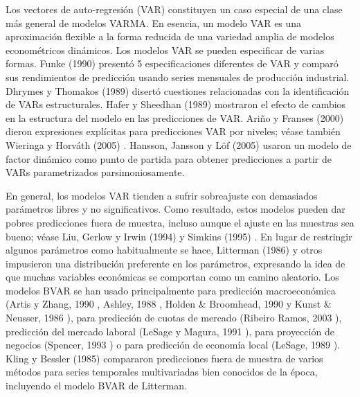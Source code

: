 \documentclass{llncs}
\begin{document}
Los vectores de auto-regresión (VAR) constituyen un caso especial de una clase más general de modelos VARMA. En esencia, un modelo VAR es una aproximación flexible a la forma reducida de una variedad amplia de modelos econométricos dinámicos. Los modelos VAR se pueden especificar de varias formas. Funke (1990) \cite{Funke1990363} presentó 5 especificaciones diferentes de VAR y comparó sus rendimientos de predicción usando series mensuales de producción industrial. Dhrymes y Thomakos (1989) \cite{Dhrymes198881} disertó cuestiones relacionadas con la identificación de VARs estructurales. Hafer y Sheedhan (1989) \cite{Hafer1989399} mostraron el efecto de cambios en la estructura del modelo en las predicciones de VAR. Ariño y Franses (2000) \cite{Arino2000111} dieron expresiones explícitas para predicciones VAR por niveles; véase también Wieringa y Horváth (2005) \cite{Wieringa2005279}. Hansson, Jansson y Löf (2005) \cite{Hansson2005377} usaron un modelo de factor dinámico como punto de partida para obtener predicciones a partir de VARs parametrizados parsimoniosamente.

En general, los modelos VAR tienden a sufrir sobreajuste con demasiados parámetros libres y no significativos. Como resultado, estos modelos pueden dar pobres predicciones fuera de muestra, incluso aunque el ajuste en las muestras sea bueno; véase Liu, Gerlow y Irwin (1994) \cite{Liu1994419} y Simkins (1995) \cite{Simkins1995569}. En lugar de restringir algunos parámetros como habitualmente se hace, Litterman (1986) \cite{Litterman198625} y otros impusieron una distribución preferente en los parámetros, expresando la idea de que muchas variables económicas se comportan como un camino aleatorio. Los modelos BVAR se han usado principalmente para predicción macroeconómica (Artis y Zhang, 1990 \cite{Artis1990349}, Ashley, 1988 \cite{Ashley1988363}, Holden \& Broomhead, 1990 \cite{Holden199011} y Kunst \& Neusser, 1986 \cite{Kunst1986447}), para predicción de cuotas de mercado (Ribeiro Ramos, 2003 \cite{RibeiroRamos200395}), predicción del mercado laboral (LeSage y Magura, 1991 \cite{LeSage1991231}), para proyección de negocios (Spencer, 1993 \cite{Spencer1993407}) o para predicción de economía local (LeSage, 1989  \cite{Lesage198937}). Kling y Bessler (1985) \cite{Kling19855} compararon predicciones fuera de muestra de varios métodos para series temporales multivariadas bien conocidos de la época, incluyendo el modelo BVAR de Litterman.
\end{document}
